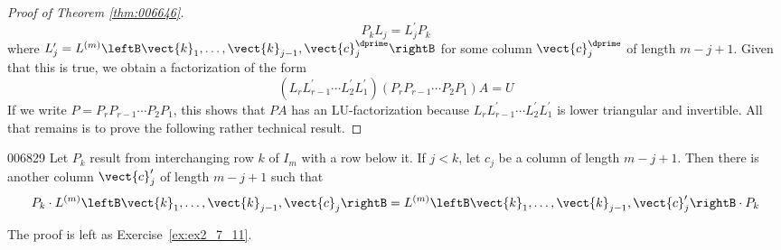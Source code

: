 \begin{proof}[Proof of Theorem \ref{thm:006646}]
\begin{equation*}
P_{k}L_{j} = L_{j}^\prime P_{k}
\end{equation*}
where $L^\prime_{j} = L^{(m)} \leftB \vect{k}_{1}, \dots, \vect{k}_{j-1}, \vect{c}^\dprime_{j} \rightB$ for some column $\vect{c}^\dprime_{j}$ of length $m - j + 1$. Given that this is true, we obtain a factorization of the form
\begin{equation*}
(L_{r}L_{r-1}^\prime \cdots L_{2}^\prime L_{1}^\prime)(P_{r}P_{r-1} \cdots P_{2}P_{1})A = U
\end{equation*}
If we write $P = P_{r}P_{r-1} \cdots P_{2}P_{1}$, this shows that $PA$ has an LU-factorization because $L_{r}L^\prime_{r-1} \cdots L^\prime_{2}L^\prime_{1}$ is lower triangular and invertible. All that remains is to prove the following rather technical result.
\end{proof}

\begin{lemma}{}{006829}
Let $P_{k}$ result from interchanging row $k$ of $I_{m}$ with a row below it. If $j < k$, let $c_{j}$ be a column of length $m - j + 1$. Then there is another column $\vect{c}_{j}^\prime$ of length $m - j + 1$ such that
\begin{equation*}
P_{k} \cdot L^{(m)} \leftB \vect{k}_{1}, \dots, \vect{k}_{j-1}, \vect{c}_{j} \rightB = L^{(m)} \leftB \vect{k}_{1}, \dots, \vect{k}_{j-1}, \vect{c}_{j}^\prime \rightB \cdot P_{k}
\end{equation*}
\end{lemma}

\noindent The proof is left as Exercise~\ref{ex:ex2_7_11}. 

